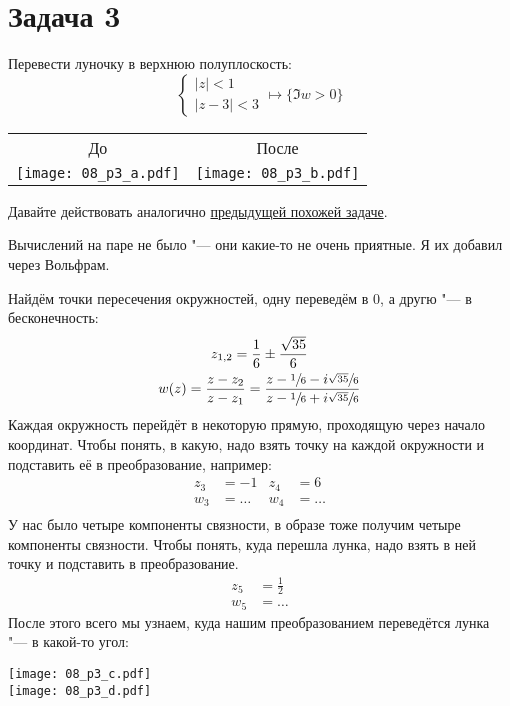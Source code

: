 \section{Задача 3}
	Перевести луночку в верхнюю полуплоскость:
	\[
		\begin{cases}
			|z| < 1 \\
			|z - 3| < 3
		\end{cases}
		\mapsto
		\{ \Im w > 0 \}
	\]
	\begin{center}
		\begin{tabular}{cc}
		До & После \\
		\texttt{[image: 08\_p3\_a.pdf]} & \texttt{[image: 08\_p3\_b.pdf]} \\
		\end{tabular}
	\end{center}

	Давайте действовать аналогично \hyperref[day150331_task5]{предыдущей похожей задаче}.
	\begin{Rem}
		Вычислений на паре не было "--- они какие-то не очень приятные.
		Я их добавил через Вольфрам.
	\end{Rem}
	Найдём точки пересечения окружностей, одну переведём в 0, а другю "--- в бесконечность:
	\begin{gather*}
		z_{1,2} = \frac 16 \pm \frac{\sqrt{35}}{6} \\
		w(z) = \frac{z-z_2}{z-z_1} = \frac{z - \sfrac 16 - i\sfrac{\sqrt{35}}6}{z-\sfrac 16 + i\sfrac{\sqrt{35}}6}
	\end{gather*}
	Каждая окружность перейдёт в некоторую прямую, проходящую через начало координат.
	Чтобы понять, в какую, надо взять точку на каждой окружности и подставить её в преобразование,
	например:
	\begin{align*}
		z_3 &= -1 & z_4 &= 6 \\
		w_3 &= \dots & w_4 &= \dots \\
	\end{align*}
	У нас было четыре компоненты связности, в образе тоже получим четыре компоненты связности.
	Чтобы понять, куда перешла лунка, надо взять в ней точку и подставить в преобразование.
	\begin{align*}
		z_5 &= \frac 1 2 \\
		w_5 &= \dots
	\end{align*}
	После этого всего мы узнаем, куда нашим преобразованием переведётся лунка "--- в какой-то угол:

	\begin{center}
		\texttt{[image: 08\_p3\_c.pdf]} \\
		\texttt{[image: 08\_p3\_d.pdf]}
	\end{center}

